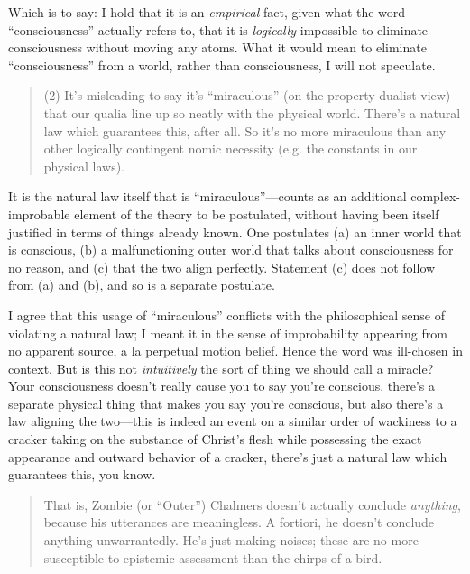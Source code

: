 {
 Which is to say: I hold that it is an \textit{empirical} fact,
given what the word
``consciousness'' actually refers
to, that it is \textit{logically} impossible to eliminate consciousness
without moving any atoms. What it would mean to eliminate
``consciousness'' from a world,
rather than consciousness, I will not speculate.}

\begin{quotation}
{
 (2) It's misleading to say it's
``miraculous'' (on the property
dualist view) that our qualia line up so neatly with the physical
world. There's a natural law which guarantees this,
after all. So it's no more miraculous than any other
logically contingent nomic necessity (e.g. the constants in our
physical laws).}
\end{quotation}

{
 It is the natural law itself that is
``miraculous''---counts as an
additional complex-improbable element of the theory to be postulated,
without having been itself justified in terms of things already known.
One postulates (a) an inner world that is conscious, (b) a
malfunctioning outer world that talks about consciousness for no
reason, and (c) that the two align perfectly. Statement (c) does not
follow from (a) and (b), and so is a separate postulate.}

{
 I agree that this usage of
``miraculous'' conflicts with the
philosophical sense of violating a natural law; I meant it in the sense
of improbability appearing from no apparent source, a la perpetual
motion belief. Hence the word was ill-chosen in context. But is this
not \textit{intuitively} the sort of thing we should call a miracle?
Your consciousness doesn't really cause you to say
you're conscious, there's a separate
physical thing that makes you say you're conscious, but
also there's a law aligning the two---this is indeed an
event on a similar order of wackiness to a cracker taking on the
substance of Christ's flesh while possessing the exact
appearance and outward behavior of a cracker, there's
just a natural law which guarantees this, you know.}

\begin{quotation}
{
 That is, Zombie (or ``Outer'')
Chalmers doesn't actually conclude \textit{anything},
because his utterances are meaningless. A fortiori, he
doesn't conclude anything unwarrantedly.
He's just making noises; these are no more susceptible
to epistemic assessment than the chirps of a bird.}
\end{quotation}

